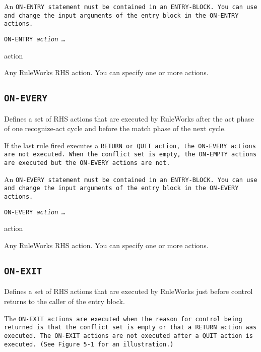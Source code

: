 {{An \tt{ON-ENTRY} statement must be contained in an \tt{ENTRY-BLOCK}.
You can use and change the input arguments of the entry block
in the \tt{ON-ENTRY} actions.

\Format

\tt{ON-ENTRY} \it{action} \ldots

\begin{arguments}
\item[action]

  Any RuleWorks RHS action. You can specify one or more actions.
\end{arguments}

\subsection{\tt{ON-EVERY}}

Defines a set of RHS actions that are executed by RuleWorks after the
act phase of one recognize-act cycle and before the match phase of the
next cycle.

If the last rule fired executes a \tt{RETURN} or \tt{QUIT} action, the
\tt{ON-EVERY} actions are not executed. When the conflict set is
empty, the \tt{ON-EMPTY} actions are executed but the \tt{ON-EVERY}
actions are not.

An \tt{ON-EVERY} statement must be contained in an \tt{ENTRY-BLOCK}.
You can use and change the input arguments of the entry block in the
\tt{ON-EVERY} actions.

\Format

\tt{ON-EVERY} \it{action} \ldots

\begin{arguments}
\item[action]

  Any RuleWorks RHS action. You can specify one or more actions.
\end{arguments}

\subsection{\tt{ON-EXIT}}

Defines a set of RHS actions that are executed by RuleWorks
just before control returns to the caller of the entry block.

The \tt{ON-EXIT} actions are executed when the reason for control
being returned is that the conflict set is empty or that a
\tt{RETURN} action was executed. The \tt{ON-EXIT} actions are not
executed after a \tt{QUIT} action is executed. (See Figure 5-1 for
an illustration.)

}}
